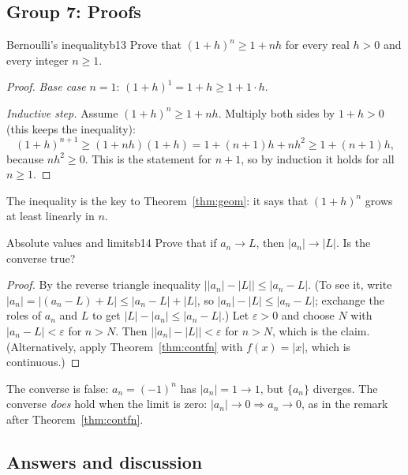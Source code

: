 \documentclass[11pt]{article}
\begin{document}
\subsection*{Group 7: Proofs}

\begin{exmp}{Bernoulli's inequality}{b13}
Prove that $(1+h)^n\ge1+nh$ for every real $h>0$ and every integer $n\ge1$.

\begin{proof}
\emph{Base case} $n=1$: $(1+h)^1=1+h\ge1+1\cdot h$.

\emph{Inductive step.} Assume $(1+h)^n\ge1+nh$. Multiply both sides by $1+h>0$ (this keeps the inequality):
\[
(1+h)^{n+1}\ge(1+nh)(1+h)=1+(n+1)h+nh^2\ge1+(n+1)h,
\]
because $nh^2\ge0$. This is the statement for $n+1$, so by induction it holds for all $n\ge1$.
\end{proof}
The inequality is the key to Theorem~\ref{thm:geom}: it says that $(1+h)^n$ grows at least linearly in $n$.
\end{exmp}

\begin{exmp}{Absolute values and limits}{b14}
Prove that if $a_n\to L$, then $|a_n|\to|L|$. Is the converse true?

\begin{proof}
By the reverse triangle inequality $\big||a_n|-|L|\big|\le|a_n-L|$. (To see it, write $|a_n|=|(a_n-L)+L|\le|a_n-L|+|L|$, so $|a_n|-|L|\le|a_n-L|$; exchange the roles of $a_n$ and $L$ to get $|L|-|a_n|\le|a_n-L|$.) Let $\varepsilon>0$ and choose $N$ with $|a_n-L|<\varepsilon$ for $n>N$. Then $\big||a_n|-|L|\big|<\varepsilon$ for $n>N$, which is the claim. (Alternatively, apply Theorem~\ref{thm:contfn} with $f(x)=|x|$, which is continuous.)
\end{proof}
The converse is false: $a_n=(-1)^n$ has $|a_n|=1\to1$, but $\{a_n\}$ diverges. The converse \emph{does} hold when the limit is zero: $|a_n|\to0\Rightarrow a_n\to0$, as in the remark after Theorem~\ref{thm:contfn}.
\end{exmp}

\subsection*{Answers and discussion}
\end{document}
